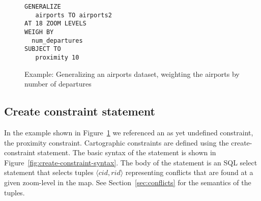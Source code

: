 
\begin{figure}[htbp]
\begin{center}
\begin{lstlisting}
GENERALIZE 
   airports TO airports2
AT 18 ZOOM LEVELS
WEIGH BY
  num_departures
SUBJECT TO 
   proximity 10 
\end{lstlisting}
\caption{Example: Generalizing an airports dataset, weighting the airports by number of departures}
\label{fig:cvl-example-airports}
\end{center}
\end{figure}





\subsection{Create constraint statement}
\label{sec:create-constraint-statement}

In the example shown in Figure~\ref{fig:cvl-example-airports} we referenced an as yet undefined constraint, the proximity constraint. Cartographic constraints are defined using the create-constraint statement.  The basic syntax of the statement is shown in Figure~\ref{fig:create-constraint-syntax}. The body of the statement is an SQL select statement that selects tuples $\langle cid, rid\rangle$ representing conflicts that are found at a given zoom-level in the map. See Section~\ref{sec:conflicts} for the semantics of the tuples.

